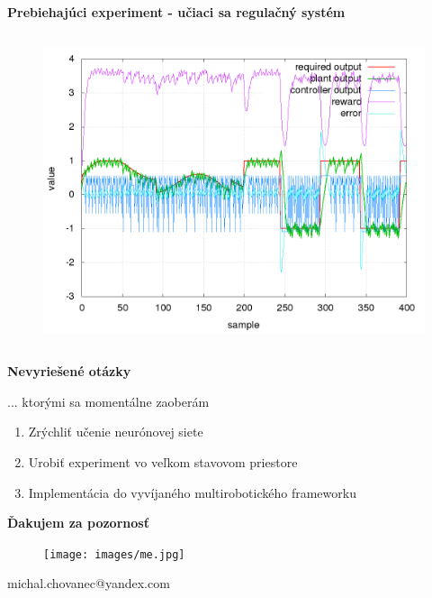 \documentclass[xcolor=dvipsnames]{beamer}
\begin{document}
\begin{frame}[fragile]{\bf Prebiehajúci experiment - učiaci sa regulačný systém}
\begin{columns}
\begin{column}{0.5\textwidth}
\begin{figure}[ht]
            \begin{center}
            \includegraphics[width=1.0\textwidth]{images/response_log.png}
            \end{center}

            \end{figure}

    	\end{column}
    \end{columns}

\end{frame}

\begin{frame}[fragile]{\bf Nevyriešené otázky}

    ... ktorými sa momentálne zaoberám

	\begin{enumerate}
	\item{Zrýchliť učenie neurónovej siete}
	\item{Urobiť experiment vo veľkom stavovom priestore}
    \item{Implementácia do vyvíjaného multirobotického frameworku}
	\end{enumerate}

\end{frame}


\begin{frame}{\bf Ďakujem za pozornosť}

\begin{figure}[ht]
\begin{center}
\begin{minipage}{0.8\linewidth}
\begin{center}
  \texttt{[image: images/me.jpg]}
\end{center}
\end{minipage}
\end{center}
\end{figure}


\centerline{michal.chovanec@yandex.com}

\end{frame}
\end{document}
